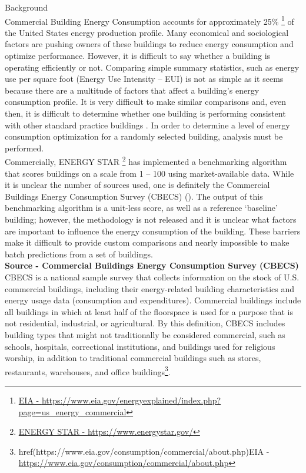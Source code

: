 {\Large {Background}}
\\[0.125in]
Commercial Building Energy Consumption accounts for approximately 25\% \footnote{\href{https://www.eia.gov/energyexplained/index.php?page=us_energy_commercial}{EIA - \url{https://www.eia.gov/energyexplained/index.php?page=us_energy_commercial}}} of the United States energy production profile.  Many economical and sociological factors are pushing owners of these buildings to reduce energy consumption and optimize performance.  However, it is difficult to say whether a building is operating efficiently or not.  Comparing simple summary statistics, such as energy use per square foot (Energy Use Intensity – EUI) is not as simple as it seems because there are a multitude of factors that affect a building’s energy consumption profile.  It is very difficult to make similar comparisons and, even then, it is difficult to determine whether one building is performing consistent with other standard practice buildings .  In order to determine a level of energy consumption optimization for a randomly selected building, analysis must be performed. 
\\[0.125in]
Commercially, ENERGY STAR \footnote{\href{https://www.energystar.gov/}{ENERGY STAR - \url{https://www.energystar.gov/}}} has implemented a benchmarking algorithm that scores buildings on a scale from 1 – 100 using market-available data.  While it is unclear the number of sources used, one is definitely the Commercial Buildings Energy Consumption Survey (CBECS) ().  The output of this benchmarking algorithm is a unit-less score, as well as a reference ‘baseline’ building; however, the methodology is not released and it is unclear what factors are important to influence the energy consumption of the building.  These barriers make it difficult to provide custom comparisons and nearly impossible to make batch predictions from a set of buildings.
\\[0.125in]
\textbf{Source - Commercial Buildings Energy Consumption Survey (CBECS)}
\\[0.0625in]
CBECS is a national sample survey that collects information on the stock of U.S. commercial buildings, including their energy-related building characteristics and energy usage data (consumption and expenditures). Commercial buildings include all buildings in which at least half of the floorspace is used for a purpose that is not residential, industrial, or agricultural. By this definition, CBECS includes building types that might not traditionally be considered commercial, such as schools, hospitals, correctional institutions, and buildings used for religious worship, in addition to traditional commercial buildings such as stores, restaurants, warehouses, and office buildings\footnote{href{(https://www.eia.gov/consumption/commercial/about.php)}{EIA - \url{https://www.eia.gov/consumption/commercial/about.php}}}.